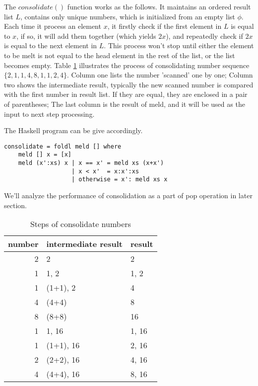 \documentclass{article}
\begin{document}
The $consolidate()$ function works as the follows. It maintains an 
ordered result list $L$, contains only unique numbers, which is 
initialized from an empty list $\phi$. Each time it process an 
element $x$, it firstly check if the first element in $L$ is equal
to $x$, if so, it will add them together (which yields $2x$), 
and repeatedly check if $2x$ is equal to the next element in $L$.
This process won't stop until either the element to be melt is
not equal to the head element in the rest of the list, or the 
list becomes empty. Table \ref{tb:num-consolidate} illustrates
the process of consolidating number sequence $\{2, 1, 1, 4, 8, 1, 1, 2, 4\}$.
Column one lists the number 'scanned' one by one; Column two
shows the intermediate result, typically the new scanned number
is compared with the first number in result list. If they
are equal, they are enclosed in a pair of parentheses; The
last column is the result of meld, and it will be used as the
input to next step processing.

The Haskell program can be give accordingly.

\lstset{language=Haskell}
\begin{lstlisting}
consolidate = foldl meld [] where
    meld [] x = [x]
    meld (x':xs) x | x == x' = meld xs (x+x')
                   | x < x'  = x:x':xs
                   | otherwise = x': meld xs x
\end{lstlisting}

We'll analyze the performance of consolidation as a part of
pop operation in later section.

\begin{table}
\caption{Steps of consolidate numbers} \label{tb:num-consolidate}
\centering
\begin{tabular}{r | l | l }
  \hline
  number & intermediate result & result \\
  \hline
  2 & 2 & 2 \\
  1 & 1, 2 & 1, 2 \\
  1 & (1+1), 2 & 4 \\
  4 & (4+4) & 8 \\
  8 & (8+8) & 16 \\
  1 & 1, 16 & 1, 16 \\
  1 & (1+1), 16 & 2, 16 \\
  2 & (2+2), 16 & 4, 16 \\
  4 & (4+4), 16 & 8, 16 \\
  \hline
\end{tabular}
\end{table}
\end{document}
